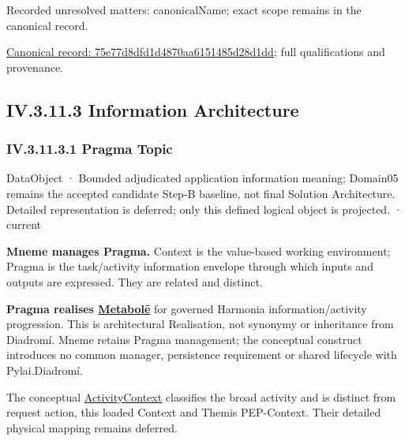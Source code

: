 {\small Recorded unresolved matters: canonicalName; exact scope remains in the canonical record.}\par
{\footnotesize \href{../../../../continuum/application/application-component/75e77d8dfd1d4870aa6151485d28d1dd.md}{Canonical record: 75e77d8dfd1d4870aa6151485d28d1dd}; full qualifications and provenance.}\par
\subsection*{IV.3.11.3 Information Architecture}
\label{navigation:IV.3.11.3}

\subsubsection*{IV.3.11.3.1 Pragma Topic}
\label{navigation:IV.3.11.3.1}

\label{element:27ad143e7c784e378556af8a57c438f7}
{\small DataObject · Bounded adjudicated application information meaning; Domain05 remains the accepted candidate Step-B baseline, not final Solution Architecture. Detailed representation is deferred; only this defined logical object is projected. · current}\par

\textbf{Mneme manages Pragma.} Context is the value-based working environment;
Pragma is the task/activity information envelope through which inputs and outputs
are expressed. They are related and distinct.



\textbf{Pragma realises \hyperref[element:c34b4929f71946708d37dbe6c1da920a]{Metabolē}}
for governed Harmonia information/activity progression. This is architectural
Realisation, not synonymy or inheritance from Diadromí. Mneme retains Pragma
management; the conceptual construct introduces no common manager, persistence
requirement or shared lifecycle with Pylai.Diadromí.



The conceptual
\hyperref[element:c34b4929f71946708d37dbe6c1da920a]{ActivityContext}
classifies the broad activity and is distinct from request action, this loaded
Context and Themis PEP-Context. Their detailed physical mapping remains deferred.



